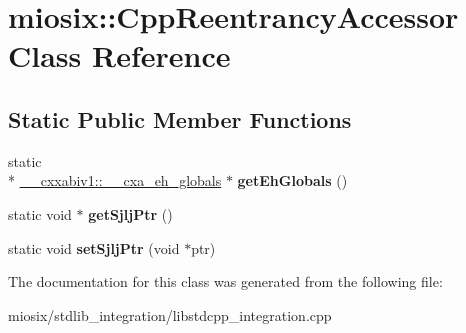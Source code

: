 \hypertarget{classmiosix_1_1_cpp_reentrancy_accessor}{\section{miosix\-:\-:Cpp\-Reentrancy\-Accessor Class Reference}
\label{classmiosix_1_1_cpp_reentrancy_accessor}
}
\subsection*{Static Public Member Functions}
\begin{DoxyCompactItemize}
\item 
\hypertarget{classmiosix_1_1_cpp_reentrancy_accessor_a934a5d8468d07b33845eba505482af51}{static \\*
\hyperlink{struct____cxxabiv1_1_1____cxa__eh__globals}{\-\_\-\-\_\-cxxabiv1\-::\-\_\-\-\_\-cxa\-\_\-eh\-\_\-globals} $\ast$ {\bfseries get\-Eh\-Globals} ()}\label{classmiosix_1_1_cpp_reentrancy_accessor_a934a5d8468d07b33845eba505482af51}

\item 
\hypertarget{classmiosix_1_1_cpp_reentrancy_accessor_a3ee6c3fd7541b406a7194c22b91cd367}{static void $\ast$ {\bfseries get\-Sjlj\-Ptr} ()}\label{classmiosix_1_1_cpp_reentrancy_accessor_a3ee6c3fd7541b406a7194c22b91cd367}

\item 
\hypertarget{classmiosix_1_1_cpp_reentrancy_accessor_a0887f93efc76369d0046fa33ce958a48}{static void {\bfseries set\-Sjlj\-Ptr} (void $\ast$ptr)}\label{classmiosix_1_1_cpp_reentrancy_accessor_a0887f93efc76369d0046fa33ce958a48}

\end{DoxyCompactItemize}


The documentation for this class was generated from the following file\-:\begin{DoxyCompactItemize}
\item 
miosix/stdlib\-\_\-integration/libstdcpp\-\_\-integration.\-cpp\end{DoxyCompactItemize}
